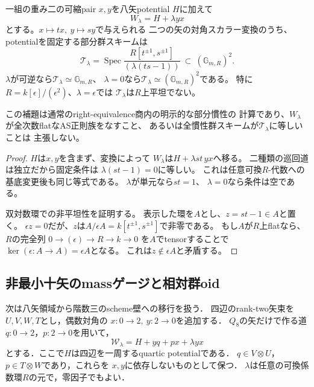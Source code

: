 \begin{lemma}
\label{lem:qa-cubic-qp-nilpotent-mass-scaling}
一組の重み二の可縮pair $x,y$を八矢potential $H$に加えて
\[
 W_\lambda=H+\lambda yx
\]
とする。$x\mapsto tx,\ y\mapsto sy$で与えられる
二つの矢の対角スカラー変換のうち、
potentialを固定する部分群スキームは
\[
 \mathcal T_\lambda=
 \operatorname{Spec}
 \frac{R[t^{\pm1},s^{\pm1}]}{(\lambda(ts-1))}
 \ \subset\ (\mathbb G_{m,R})^2.
 \tag{Mass}\label{eq:qa-qp-mass-scaling-group}
\]
$\lambda$が可逆なら$\mathcal T_\lambda\simeq\mathbb G_{m,R}$、
$\lambda=0$なら$\mathcal T_\lambda\simeq(\mathbb G_{m,R})^2$である。
特に$R=k[\epsilon]/(\epsilon^2)$、$\lambda=\epsilon$では
$\mathcal T_\lambda$は$R$上平坦でない。

この補題は通常のright-equivalence商内の明示的な部分慣性の
計算であり、$W_\lambda$が全次数flatなAS正則族をなすこと、
あるいは全慣性群スキームが$\mathcal T_\lambda$に等しいことは
主張しない。
\end{lemma}
\begin{proof}
$H$は$x,y$を含まず、変換によって
$W_\lambda$は$H+\lambda st\,yx$へ移る。
二種類の巡回道は独立だから固定条件は
$\lambda(st-1)=0$に等しい。
これは任意可換$R$-代数への基底変更後も同じ等式である。
$\lambda$が単元なら$st=1$、
$\lambda=0$なら条件は空である。

双対数環での非平坦性を証明する。
表示した環を$A$とし、$z=st-1\in A$と置く。
$\epsilon z=0$だが、$z$は$A/\epsilon A
=k[t^{\pm1},s^{\pm1}]$で非零である。
もし$A$が$R$上flatなら、$R$の完全列
$0\to(\epsilon)\to R\to k\to0$
を$A$でtensorすることで
$\ker(\epsilon:A\to A)=\epsilon A$となる。
これは$z\notin\epsilon A$と矛盾する。
\end{proof}


\subsection{非最小十矢のmassゲージと相対群oid}
\label{subsec:qa-ten-arrow-mass-gerbe}

次は八矢領域から階数三のscheme壁への移行を扱う．
四辺のrank-two矢束を$U,V,W,T$とし，偶数対角の
$x:0\to2,\ y:2\to0$を追加する．
$Q_8$の矢だけで作る道
$q:0\to2$，$p:2\to0$を用いて，
\[
 \mathcal W_\lambda=H+yq+px+\lambda yx
 \tag{MG}\label{eq:qa-mass-gauge-potential}
\]
とする．ここで$H$は四辺を一周するquartic potentialである．
$q\in V\otimes U$，$p\in T\otimes W$であり，これらを
$x,y$に依存しないものとして保つ．
$\lambda$は任意の可換係数環$R$の元で，零因子でもよい．

